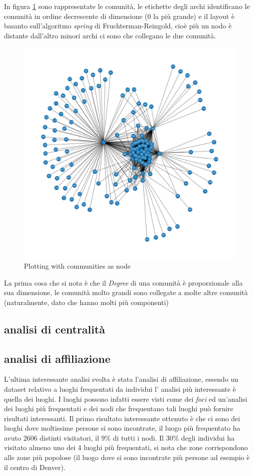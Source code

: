 \documentclass[a4paper]{article}
\begin{document}
In figura \ref{FIG:communities_plot} sono rappresentate le comunità, le etichette degli archi identificano le comunità in ordine decrescente di dimensione (0 la più grande) e il layout è basanto sull'algoritmo \textit{spring} di Fruchterman-Reingold, cioè più un nodo è distante dall'altro minori archi ci sono che collegano le due comunità.\\
\newpage
\begin{figure}[!ht]
\centering
\includegraphics[width=1\textwidth]{cummunity_plot.png}
\caption{Plotting with communities as node} \label{FIG:communities_plot}
\end{figure}
La prima cosa che si nota è che il \textit{Degree} di una comunità è proporzionale alla sua dimensione, le comunità molto grandi sono collegate a molte altre comunità (naturalmente, dato che hanno molti più componenti) %

\subsection{analisi di centralità}
\subsection{analisi di affiliazione}
L'ultima interessante analisi svolta è stata l'analisi di affiliazione, essendo un dataset relativo a luoghi frequentati da individui l' analisi più interessante è quella dei luoghi.
I luoghi possono infatti essere visti come dei \textit{foci} ed un'analisi dei luoghi più frequentati e dei nodi che frequentano tali luoghi può fornire risultati interessanti.
Il primo risultato interessante ottenuto è che ci sono dei luoghi dove moltissime persone si sono incontrate, il luogo più frequentato ha avuto $2606$ distinti visitatori, il $9\%$ di tutti i nodi. Il 30\% degli individui ha visitato almeno uno dei 4 luoghi più frequentati, si nota che zone corrispondono alle zone più popolose (il luogo dove si sono incontrate più persone ad esempio è il centro di Denver).
\end{document}
